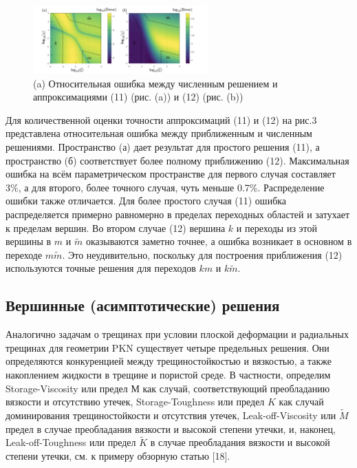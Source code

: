 \documentclass[a4paper, 12pt]{article}
\begin{document}
\begin{figure}[H]
\center
\includegraphics[width=0.6\textwidth]{Dontsov-2021-fig3}
\caption{(a) Относительная ошибка между численным решением и аппроксимациями (11) (рис. (a)) и (12) (рис. (b))}
\label{fig:Dontsov-2021-fig3}
\end{figure}

Для количественной оценки точности аппроксимаций (11) и (12) на рис.3 представлена относительная ошибка между приближенным и численным решениями.
Пространство (а) дает результат для простого решения (11), а пространство (б) соответствует более полному приближению (12).
Максимальная ошибка на всём параметрическом пространстве для первого случая составляет 3\%, а для второго, более точного случая, чуть меньше 0.7\%.
Распределение ошибки также отличается.
Для более простого случая (11) ошибка распределяется примерно равномерно в пределах переходных областей и затухает к пределам вершин.
Во втором случае (12) вершина $k$ и переходы из этой вершины в $m$ и $\tilde{m}$ оказываются заметно точнее, а ошибка возникает в основном в переходе $m\tilde{m}$.
Это неудивительно, поскольку для построения приближения (12) используются точные решения для переходов $km$ и $k\tilde{m}$.

\subsection{Вершинные (асимптотические) решения}

Аналогично задачам о трещинах при условии плоской деформации и радиальных трещинах для геометрии PKN существует четыре предельных решения.
Они определяются конкуренцией между трещиностойкостью и вязкостью, а также накоплением жидкости в трещине и пористой среде.
В частности, определим Storage-Viscosity или предел $М$ как случай, соответствующий преобладанию вязкости и отсутствию утечек, Storage-Toughness или предел $K$ как случай доминирования трещиностойкости и отсутствия утечек, Leak-off-Viscosity или $\tilde{M}$ предел в случае преобладания вязкости и высокой степени утечки, и, наконец, Leak-off-Toughness или предел $\tilde{K}$ в случае преобладания вязкости и высокой степени утечки, см. к примеру обзорную статью [18].\\
\end{document}
